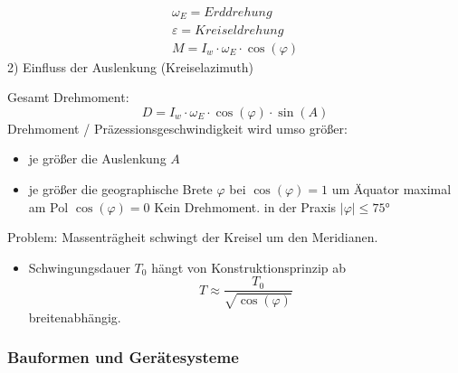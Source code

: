 \documentclass[12pt]{article}
\begin{document}
\begin{gather*}
	\omega_E = Erddrehung \\
	\varepsilon = Kreiseldrehung \\
	M = I_w \cdot \omega_E \cdot \cos(\varphi)
\end{gather*}
2) Einfluss der Auslenkung (Kreiselazimuth)
\begin{figure}[ht]\centering
\end{figure}
Gesamt Drehmoment:
\begin{equation*}
	D = I_w \cdot \omega_E \cdot \cos(\varphi) \cdot \sin(A)
\end{equation*}
Drehmoment / Präzessionsgeschwindigkeit wird umso größer:
\begin{itemize}
	\item je größer die Auslenkung $A$
	\item je größer die geographische Brete $\varphi$ \newline
	bei $\cos(\varphi) = 1$ um Äquator maximal \newline
	am Pol $\cos(\varphi) = 0$ Kein Drehmoment. \newline
	in der Praxis $|\varphi| \leq 75°$
\end{itemize}
Problem: Massenträgheit schwingt der Kreisel um den Meridianen.
\begin{itemize}
	\item Schwingungsdauer $T_0$ hängt von Konstruktionsprinzip ab
	\begin{equation*}
		T \approx \frac{T_0}{\sqrt{\cos(\varphi)}}
	\end{equation*}
	breitenabhängig.
\end{itemize}
\subsubsection{Bauformen und Gerätesysteme}
\end{document}
